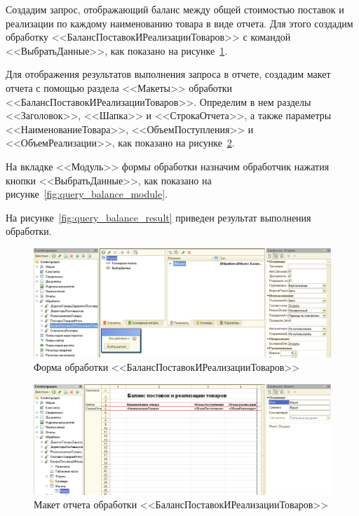 \pagebreak

Создадим запрос, отображающий баланс между общей стоимостью поставок и
реализации по каждому наименованию товара в виде отчета.
Для этого создадим обработку <<БалансПоставокИРеализацииТоваров>>
с командой <<ВыбратьДанные>>,
как показано на рисунке~\ref{fig:query_balance_form}.

Для отображения результатов выполнения запроса в отчете,
создадим макет отчета с помощью раздела <<Макеты>> обработки
<<БалансПоставокИРеализацииТоваров>>.
Определим в нем разделы <<Заголовок>>, <<Шапка>> и <<СтрокаОтчета>>,
а также параметры <<НаименованиеТовара>>, <<ОбъемПоступления>> и
<<ОбъемРеализации>>, как показано на рисунке~\ref{fig:query_balance_report}.

На вкладке <<Модуль>> формы обработки назначим обработчик нажатия кнопки
<<ВыбратьДанные>>, как показано на рисунке~\ref{fig:query_balance_module}.

На рисунке~\ref{fig:query_balance_result} приведен результат
выполнения обработки.

\begin{figure}[h!]
  \centering
  \includegraphics[width=150mm]{pic/query_balance_form}
  \caption{Форма обработки <<БалансПоставокИРеализацииТоваров>>}
  \label{fig:query_balance_form}
\end{figure}

\begin{figure}[h!]
  \centering
  \includegraphics[width=150mm]{pic/query_balance_report}
  \caption{Макет отчета обработки <<БалансПоставокИРеализацииТоваров>>}
  \label{fig:query_balance_report}
\end{figure}


